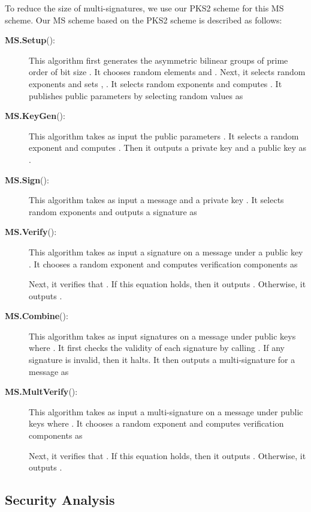 \documentclass[11pt,letterpaper]{article}
\newcommand{\tb}[1]{\textbf{#1}}
\begin{document}
To reduce the size of multi-signatures, we use our PKS2 scheme for this MS
scheme. Our MS scheme based on the PKS2 scheme is described as follows:

\begin{description}
\item [\tb{MS.Setup}():] This algorithm first generates the
    asymmetric bilinear groups  of prime order  of bit
    size . It chooses random elements  and
    . Next, it selects random exponents  and sets , . It selects random exponents  and computes . It publishes public parameters by selecting random values
     as
    

\item [\tb{MS.KeyGen}():] This algorithm takes as input the public
    parameters . It selects a random exponent  and
    computes . Then it outputs a private key  and a public key as .

\item [\tb{MS.Sign}():] This algorithm takes as input a message  and a private key . It selects random exponents
     and outputs a signature as
    

\item [\tb{MS.Verify}():] This algorithm takes as input a
    signature  on a message  under a public key . It chooses
    a random exponent  and computes verification components as
    
    Next, it verifies that . If
    this equation holds, then it outputs . Otherwise, it outputs .

\item [\tb{MS.Combine}():] This algorithm
    takes as input signatures  on a message  under public keys  where . It first checks the validity of
    each signature  by calling
    . If any signature is invalid, then
    it halts. It then outputs a multi-signature for a message  as
    

\item [\tb{MS.MultVerify}():] This algorithm takes as
    input a multi-signature  on a message  under public keys
     where . It chooses
    a random exponent  and computes verification components as
    
    Next, it verifies that . If this equation holds, then it outputs . Otherwise, it
    outputs .
\end{description}

\subsection{Security Analysis}
\end{document}
